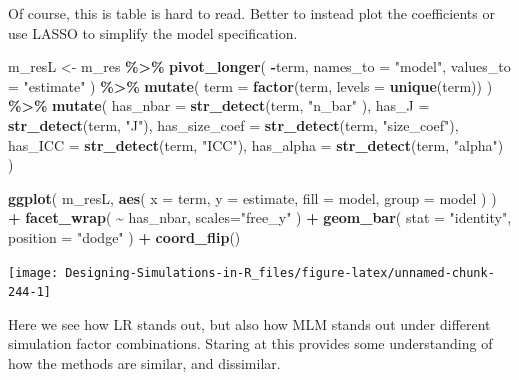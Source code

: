 \documentclass[
]{book}
\newenvironment{Shaded}{\begin{snugshade}}{\end{snugshade}}
\newcommand{\AttributeTok}[1]{\textcolor[rgb]{0.13,0.29,0.53}{#1}}
\newcommand{\FunctionTok}[1]{\textcolor[rgb]{0.13,0.29,0.53}{\textbf{#1}}}
\newcommand{\NormalTok}[1]{#1}
\newcommand{\OtherTok}[1]{\textcolor[rgb]{0.56,0.35,0.01}{#1}}
\newcommand{\SpecialCharTok}[1]{\textcolor[rgb]{0.81,0.36,0.00}{\textbf{#1}}}
\newcommand{\StringTok}[1]{\textcolor[rgb]{0.31,0.60,0.02}{#1}}
\begin{document}
Of course, this is table is hard to read. Better to instead plot the coefficients or use LASSO to simplify the model specification.

\begin{Shaded}
\begin{Highlighting}[]
\NormalTok{m\_resL }\OtherTok{\textless{}{-}}\NormalTok{ m\_res }\SpecialCharTok{\%\textgreater{}\%}
  \FunctionTok{pivot\_longer}\NormalTok{( }\SpecialCharTok{{-}}\NormalTok{term, }
                \AttributeTok{names\_to =} \StringTok{"model"}\NormalTok{, }\AttributeTok{values\_to =} \StringTok{"estimate"}\NormalTok{ ) }\SpecialCharTok{\%\textgreater{}\%}
  \FunctionTok{mutate}\NormalTok{( }\AttributeTok{term =} \FunctionTok{factor}\NormalTok{(term, }\AttributeTok{levels =} \FunctionTok{unique}\NormalTok{(term)) ) }\SpecialCharTok{\%\textgreater{}\%}
  \FunctionTok{mutate}\NormalTok{( }\AttributeTok{has\_nbar =} \FunctionTok{str\_detect}\NormalTok{(term, }\StringTok{"n\_bar"}\NormalTok{ ),}
          \AttributeTok{has\_J =} \FunctionTok{str\_detect}\NormalTok{(term, }\StringTok{"J"}\NormalTok{),}
          \AttributeTok{has\_size\_coef =} \FunctionTok{str\_detect}\NormalTok{(term, }\StringTok{"size\_coef"}\NormalTok{),}
          \AttributeTok{has\_ICC =} \FunctionTok{str\_detect}\NormalTok{(term, }\StringTok{"ICC"}\NormalTok{),}
          \AttributeTok{has\_alpha =} \FunctionTok{str\_detect}\NormalTok{(term, }\StringTok{"alpha"}\NormalTok{) )}

\FunctionTok{ggplot}\NormalTok{( m\_resL,}
        \FunctionTok{aes}\NormalTok{( }\AttributeTok{x =}\NormalTok{ term, }\AttributeTok{y =}\NormalTok{ estimate, }
             \AttributeTok{fill =}\NormalTok{ model, }\AttributeTok{group =}\NormalTok{ model ) ) }\SpecialCharTok{+}
  \FunctionTok{facet\_wrap}\NormalTok{( }\SpecialCharTok{\textasciitilde{}}\NormalTok{ has\_nbar, }\AttributeTok{scales=}\StringTok{"free\_y"}\NormalTok{ ) }\SpecialCharTok{+}
  \FunctionTok{geom\_bar}\NormalTok{( }\AttributeTok{stat =} \StringTok{"identity"}\NormalTok{, }\AttributeTok{position =} \StringTok{"dodge"}\NormalTok{ ) }\SpecialCharTok{+}
  \FunctionTok{coord\_flip}\NormalTok{()}
\end{Highlighting}
\end{Shaded}

\begin{center}\texttt{[image: Designing-Simulations-in-R\_files/figure-latex/unnamed-chunk-244-1]} \end{center}

Here we see how LR stands out, but also how MLM stands out under different simulation factor combinations.
Staring at this provides some understanding of how the methods are similar, and dissimilar.
\end{document}
